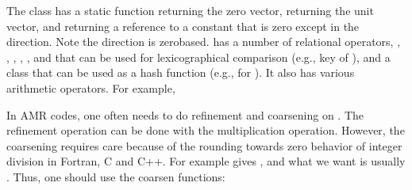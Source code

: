 \documentclass[letterpaper,10pt,english]{sphinxmanual}
\begin{document}
\sphinxAtStartPar
The class has a static function  returning the zero
vector,  returning the unit vector, and
 returning a reference to a constant
 that is zero except in the \sphinxhyphen{}direction. Note the
direction is zero\sphinxhyphen{}based.  has a number of relational operators,
, , , ,  , and  that can be
used for lexicographical comparison (e.g., key of ), and a class
 that can be used as a hash function (e.g., for
). It also has various arithmetic operators. For
example,

\begin{sphinxVerbatim}[commandchars=\\\{\}]
   
   
    
      
\end{sphinxVerbatim}

\sphinxAtStartPar
In AMR codes, one often needs to do refinement and coarsening on
. The refinement operation can be done with the multiplication
operation. However, the coarsening requires care because of the rounding
towards zero behavior of integer division in Fortran, C and C++. For example
 gives , and what we want is usually . Thus, one should use the coarsen functions:
\end{document}
